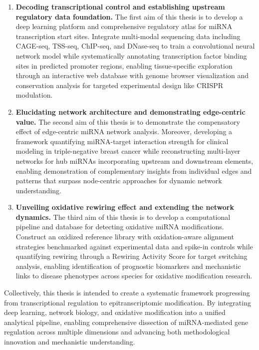 \begin{enumerate}
\item \textbf{Decoding transcriptional control and establishing upstream regulatory data foundation.} The first aim of this thesis is to develop a deep learning platform and comprehensive regulatory atlas for miRNA transcription start sites. Integrate multi-modal sequencing data including CAGE-seq, TSS-seq, ChIP-seq, and DNase-seq to train a convolutional neural network model while systematically annotating transcription factor binding sites in predicted promoter regions, enabling tissue-specific exploration through an interactive web database with genome browser visualization and conservation analysis for targeted experimental design like CRISPR modulation.

\item \textbf{Elucidating network architecture and demonstrating edge-centric value.} The second aim of this thesis is to demonstrate the compensatory effect of edge-centric miRNA network analysis. Moreover, developing a framework quantifying miRNA-target interaction strength for clinical modeling in triple-negative breast cancer while reconstructing multi-layer networks for hub miRNAs incorporating upstream and downstream elements, enabling demonstration of complementary insights from individual edges and patterns that surpass node-centric approaches for dynamic network understanding.

\item \textbf{Unveiling oxidative rewiring effect and extending the network dynamics.} The third aim of this thesis is to develop a computational pipeline and database for detecting oxidative miRNA modifications. Construct an oxidized reference library with oxidation-aware alignment strategies benchmarked against experimental data and spike-in controls while quantifying rewiring through a Rewiring Activity Score for target switching analysis, enabling identification of prognostic biomarkers and mechanistic links to disease phenotypes across species for oxidative modification research.
\end{enumerate}

Collectively, this thesis is intended to create a systematic framework progressing from transcriptional regulation to epitranscriptomic modification. By integrating deep learning, network biology, and oxidative modification into a unified analytical pipeline, enabling comprehensive dissection of miRNA-mediated gene regulation across multiple dimensions and advancing both methodological innovation and mechanistic understanding.
